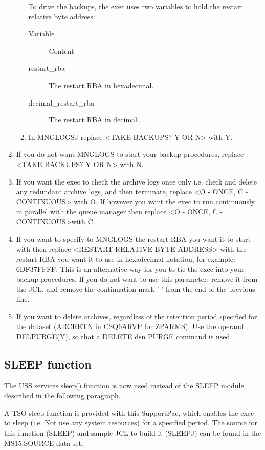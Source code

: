 \documentclass[a4paper,12pt]{report}
\begin{document}
\begin{enumerate}
\begin{enumerate}
To drive the backups, the exec uses two variables to hold the restart
relative byte address: 

\begin{description}
\item [Variable] Content
\item [restart\_rba] The restart RBA in hexadecimal.
\item [decimal\_restart\_rba] The restart RBA in decimal.
\end{description}

\item In MNGLOGSJ replace <TAKE BACKUPS? Y OR N> with Y.
\end{enumerate}
\item If you do not want MNGLOGS to start your backup procedures, replace
<TAKE BACKUPS? Y OR N> with N.
\item If you want the exec to check the archive logs once only i.e. check
and delete any redundant archive logs, and then terminate, replace
<O - ONCE, C - CONTINUOUS> with O.  If however you want the exec to
run continuously in parallel with the queue manager then replace
<O - ONCE, C - CONTINUOUS>with C.
\item If you want to specify to MNGLOGS the restart RBA you want it to
start with then replace <RESTART RELATIVE BYTE ADDRESS> with the restart
RBA you want it to use in hexadecimal notation, for example:
6DF37FFFF.  This is an alternative way for you to tie the exec into your
backup procedures.  If you do not want to use this parameter, remove it
from the JCL, and remove the continuation mark '-' from the end of the
previous line.
\item If you want to delete archives, regardless of the retention period
specified for the dataset (ARCRETN in CSQ6ARVP for ZPARMS).  Use the
operand DELPURGE(Y), so that a DELETE dsn PURGE command is used.
\end{enumerate}
\subsection{SLEEP function}
%
The USS services sleep() function is now used instead of the SLEEP
module described in the following paragraph.

A TSO sleep function is provided with this SupportPac, which enables
the exec to sleep (i.e. Not use any system resources) for a specified
period.  The source for this function (SLEEP) and sample JCL to build
it (SLEEPJ) can be found in the MS15.SOURCE data set.
\end{document}

